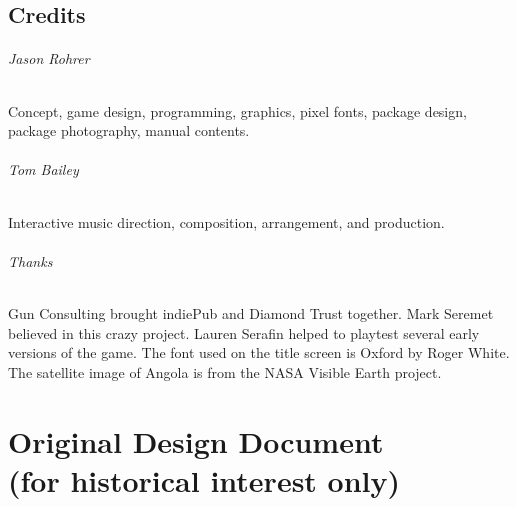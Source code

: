 \documentclass[8pt]{extbook}
\begin{document}
\chapter*{Credits}

\paragraph{Jason Rohrer}
Concept, game design, programming, graphics, pixel fonts, package design, package photography, manual contents.

\paragraph{Tom Bailey}
Interactive music direction, composition, arrangement, and production.

\paragraph{Thanks}
Gun Consulting brought indiePub and Diamond Trust together.  Mark Seremet believed in this crazy project.  Lauren Serafin helped to playtest several early versions of the game.  The font used on the title screen is Oxford by Roger White.  The satellite image of Angola is from the NASA Visible Earth project.




\part[Original Design Document]{Original Design Document\\{\large(for historical interest only)}}
\addtocounter{chapter}{1}
\setcounter{section}{0}


\end{document}
